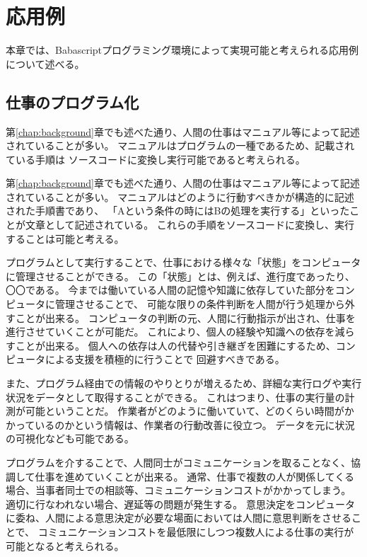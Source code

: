 \chapter{応用例}\label{chap:application}

本章では、Babascriptプログラミング環境によって実現可能と考えられる応用例について述べる。

\section{仕事のプログラム化}\label{ux4ed5ux4e8bux306eux30d7ux30edux30b0ux30e9ux30e0ux5316}

第\ref{chap:background}章でも述べた通り、人間の仕事はマニュアル等によって記述されていることが多い。
マニュアルはプログラムの一種であるため、記載されている手順は
ソースコードに変換し実行可能であると考えられる。

第\ref{chap:background}章でも述べた通り、人間の仕事はマニュアル等によって記述されていることが多い。
マニュアルはどのように行動すべきかが構造的に記述された手順書であり、
「Aという条件の時にはBの処理を実行する」といったことが文章として記述されている。
これらの手順をソースコードに変換し、実行することは可能と考える。

プログラムとして実行することで、仕事における様々な「状態」をコンピュータに管理させることができる。
この「状態」とは、例えば、進行度であったり、〇〇である。
今までは働いている人間の記憶や知識に依存していた部分をコンピュータに管理させることで、
可能な限りの条件判断を人間が行う処理から外すことが出来る。
コンピュータの判断の元、人間に行動指示が出され、仕事を進行させていくことが可能だ。
これにより、個人の経験や知識への依存を減らすことが出来る。
個人への依存は人の代替や引き継ぎを困難にするため、コンピュータによる支援を積極的に行うことで
回避すべきである。

また、プログラム経由での情報のやりとりが増えるため、詳細な実行ログや実行状況をデータとして取得することができる。
これはつまり、仕事の実行量の計測が可能ということだ。
作業者がどのように働いていて、どのくらい時間がかかっているのかという情報は、作業者の行動改善に役立つ。
データを元に状況の可視化なども可能である。

プログラムを介することで、人間同士がコミュニケーションを取ることなく、協調して仕事を進めていくことが出来る。
通常、仕事で複数の人が関係してくる場合、当事者同士での相談等、コミュニケーションコストがかかってしまう。
適切に行なわれない場合、遅延等の問題が発生する。
意思決定をコンピュータに委ね、人間による意思決定が必要な場面においては人間に意思判断をさせることで、
コミュニケーションコストを最低限にしつつ複数人による仕事の実行が可能となると考えられる。


